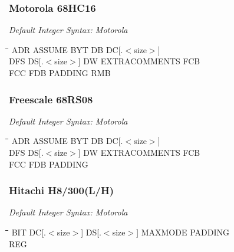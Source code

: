 \subsubsection{Motorola 68HC16}

{\em Default Integer Syntax: Motorola}

{\tt\begin{tabbing}
\hspace{3cm}\=\hspace{3cm}\=\hspace{3cm}\=\hspace{3cm}\=\kill
ADR        \> ASSUME      \> BYT         \> DB          \> DC[.$<$size$>$] \\
DFS        \> DS[.$<$size$>$] \> DW      \> EXTRACOMMENTS \> FCB \\
FCC        \> FDB         \> PADDING     \> RMB \\
\end{tabbing}}

\subsubsection{Freescale 68RS08}

{\em Default Integer Syntax: Motorola}

{\tt\begin{tabbing}
\hspace{3cm}\=\hspace{3cm}\=\hspace{3cm}\=\hspace{3cm}\=\kill
ADR        \> ASSUME      \> BYT         \> DB          \> DC[.$<$size$>$] \\
DFS        \> DS[.$<$size$>$] \> DW      \> EXTRACOMMENTS \> FCB \\
FCC        \> FDB         \> PADDING \\
\end{tabbing}}

\subsubsection{Hitachi H8/300(L/H)}

{\em Default Integer Syntax: Motorola}

{\tt\begin{tabbing}
\hspace{3cm}\=\hspace{3cm}\=\hspace{3cm}\=\hspace{3cm}\=\kill
BIT    \> DC[.$<$size$>$] \> DS[.$<$size$>$] \> MAXMODE     \> PADDING \\
REG    \\
\end{tabbing}}


